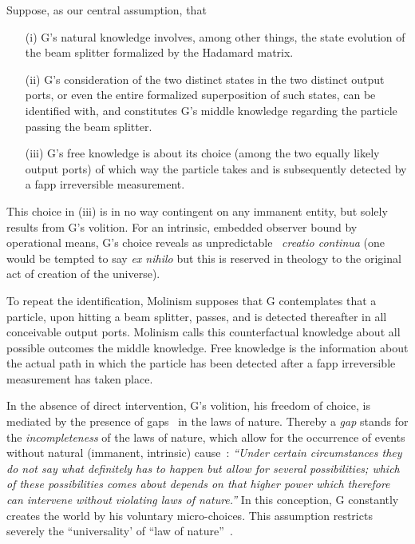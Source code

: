 \documentclass[%
  twocolumn,
 showpacs,
 showkeys,
 preprintnumbers,
 amsmath,amssymb,
 aps,
  pra,
  longbibliography,
 ]{revtex4-1}
\begin{document}
Suppose, as our central assumption, that
\begin{itemize}
\item[(i)]
G's natural knowledge %
involves, among other things, the state evolution of the beam splitter formalized by the Hadamard matrix.
\item[(ii)]
G's consideration of the two distinct states in the two distinct output ports, or even the entire formalized superposition of such states,
can be identified with, and constitutes G's middle knowledge regarding the particle passing the beam splitter.
\item[(iii)]
G's free knowledge is about its  choice (among the two equally likely output ports) of which way the particle takes and is subsequently detected by a fapp irreversible measurement.
\end{itemize}

This choice in (iii) is in no way contingent on any immanent entity, but solely results from G's volition.
For an intrinsic, embedded observer bound by operational means, G's choice %
reveals as unpredictable~\cite{acs-2015-info6040773} {\it creatio continua} (one would be tempted to say {\it ex nihilo} but this is reserved in theology to the original act of creation of the universe).



To repeat the identification, Molinism supposes that G contemplates that a particle, upon hitting a beam splitter, passes, and is detected thereafter in all conceivable output ports.
Molinism calls this counterfactual knowledge about all possible outcomes the middle knowledge.
Free knowledge is the information about the actual path in which the particle has been detected after a fapp irreversible measurement has taken place.

In the absence of direct intervention,
G's volition, his freedom of choice, is mediated by  the presence of gaps~\cite[Sect.~II,~12]{frank,franke} in the laws of nature.
Thereby a {\em gap} stands for the {\em incompleteness} of the laws of nature,
which allow for the occurrence of events without natural (immanent, intrinsic) cause~\cite[Sect.~II,~9]{frank,franke}: {\em ``Under
certain circumstances they do not say what definitely has to happen
but allow for several possibilities; which of these possibilities comes
about depends on that higher power which therefore can intervene
without violating laws of nature.''}
In this conception, G constantly creates the world by his voluntary micro-choices.
This  assumption restricts severely the ``universality'  of ``law of nature''~\cite{lawless}.
\end{document}
